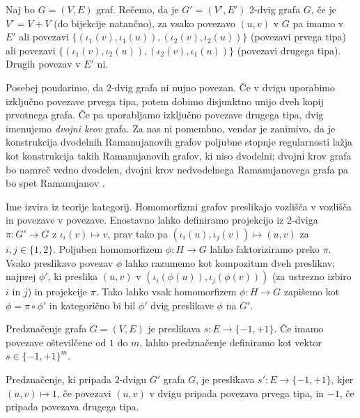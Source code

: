 \begin{definicija}
    Naj bo \(G = (V, E)\) graf. Rečemo, da je \(G'= (V', E')\) 2-dvig grafa \(G\), če je \(V' = V + V\) (do bijekcije natančno), za vsako povezavo \((u, v)\) v \(G\) pa imamo v \(E'\) ali povezavi \(\{(\iota_1(v), \iota_1(u)), (\iota_2(v), \iota_2(u))\}\) (povezavi prvega tipa) ali povezavi \(\{(\iota_1(v), \iota_2(u)), (\iota_2(v), \iota_1(u))\}\) (povezavi drugega tipa). Drugih povezav v \(E'\) ni.
\end{definicija}

Posebej poudarimo, da \(2\)-dvig grafa ni nujno povezan. Če v dvigu uporabimo izključno povezave prvega tipa, potem dobimo disjunktno unijo dveh kopij prvotnega grafa. Če pa uporabljamo izključno povezave drugega tipa, dvig imenujemo \emph{dvojni krov} grafa. Za nas ni pomembno, vendar je zanimivo, da je konstrukcija dvodelnih Ramanujanovih grafov poljubne stopnje regularnosti lažja kot konstrukcija takih Ramanujanovih grafov, ki niso dvodelni; dvojni krov grafa bo namreč vedno dvodelen, dvojni krov nedvodelnega Ramanujanovega grafa pa bo spet Ramanujanov \cite{marcus2014interlacingfamiliesibipartite}.

Ime izvira iz teorije kategorij. Homomorfizmi grafov preslikajo vozlišča v vozlišča in povezave v povezave. Enostavno lahko definiramo projekcijo iz \(2\)-dviga \(\pi\colon G'\to G\) z \(\iota_i(v)\mapsto v\), prav tako pa \((\iota_i(u), \iota_j(v))\mapsto (u, v)\) za \(i, j\in \{1,2\}\). Poljuben homomorfizem \(\phi\colon H\to G\) lahko faktoriziramo preko \(\pi\). Vsako preslikavo povezav \(\phi\) lahko razumemo kot kompozitum dveh preslikav; najprej \(\phi'\), ki preslika \((u, v)\) v \((\iota_i(\phi(u)), \iota_j(\phi(v)))\) (za ustrezno izbiro \(i\) in \(j\)) in projekcije \(\pi\). Tako lahko vsak homomorfizem \(\phi\colon H\to G\) zapišemo kot \(\phi = \pi\circ \phi'\) in kategorično bi bil \(\phi'\) dvig preslikave \(\phi\) na \(G'\).

\begin{definicija}
    Predznačenje grafa \(G = (V, E)\) je preslikava \(s\colon E\to \{-1, +1\}\). Če imamo povezave oštevilčene od \(1\) do \(m\), lahko predznačenje definiramo kot vektor \(s\in \{-1, +1\}^m\).

    Predznačenje, ki pripada \(2\)-dvigu \(G'\) grafa \(G\), je preslikava \(s'\colon E \to \{-1, +1\}\), kjer \((u, v) \mapsto 1\), če povezavi \((u, v)\) v dvigu pripada povezava prvega tipa, in \(-1\), če pripada povezava drugega tipa.
\end{definicija}

